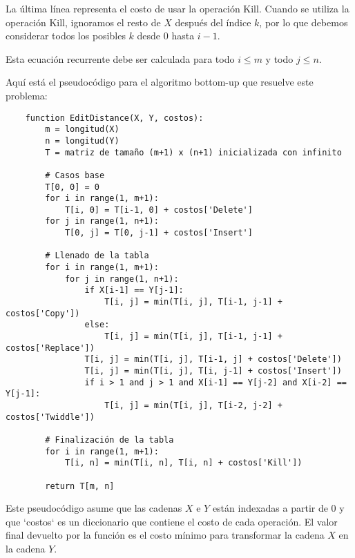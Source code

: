 \begin{problema}
\begin{enumerate}
\begin{sol}
La última línea representa el costo de usar la operación Kill. Cuando se utiliza la operación Kill, ignoramos el resto de $X$ después del índice $k$, por lo que debemos considerar todos los posibles $k$ desde $0$ hasta $i-1$. 

Esta ecuación recurrente debe ser calculada para todo $i \leq m$ y todo $j \leq n$.
    \end{sol}
\end{enumerate}


Aquí está el pseudocódigo para el algoritmo bottom-up que resuelve este problema:

\begin{verbatim}
    function EditDistance(X, Y, costos):
        m = longitud(X)
        n = longitud(Y)
        T = matriz de tamaño (m+1) x (n+1) inicializada con infinito

        # Casos base
        T[0, 0] = 0
        for i in range(1, m+1):
            T[i, 0] = T[i-1, 0] + costos['Delete']
        for j in range(1, n+1):
            T[0, j] = T[0, j-1] + costos['Insert']

        # Llenado de la tabla
        for i in range(1, m+1):
            for j in range(1, n+1):
                if X[i-1] == Y[j-1]:
                    T[i, j] = min(T[i, j], T[i-1, j-1] + costos['Copy'])
                else:
                    T[i, j] = min(T[i, j], T[i-1, j-1] + costos['Replace'])
                T[i, j] = min(T[i, j], T[i-1, j] + costos['Delete'])
                T[i, j] = min(T[i, j], T[i, j-1] + costos['Insert'])
                if i > 1 and j > 1 and X[i-1] == Y[j-2] and X[i-2] == Y[j-1]:
                    T[i, j] = min(T[i, j], T[i-2, j-2] + costos['Twiddle'])

        # Finalización de la tabla
        for i in range(1, m+1):
            T[i, n] = min(T[i, n], T[i, n] + costos['Kill'])

        return T[m, n]
\end{verbatim}

Este pseudocódigo asume que las cadenas $X$ e $Y$ están indexadas a partir de 0 y que `costos` es un diccionario que contiene el costo de cada operación. El valor final devuelto por la función es el costo mínimo para transformar la cadena $X$ en la cadena $Y$.


\end{problema}




